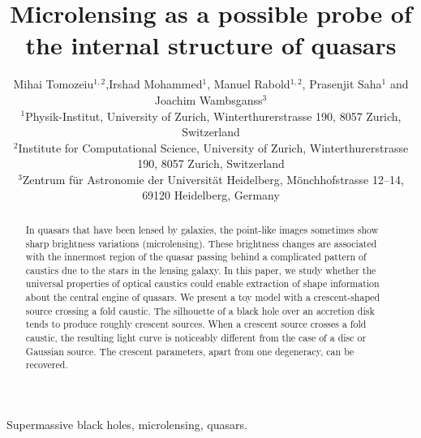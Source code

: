 \documentclass[usenatbib]{mn2e}
\title{Microlensing as a possible probe of the internal structure of quasars}
\author[Tomozeiu et al]{Mihai Tomozeiu$^{1,2}$,Irshad Mohammed$^1$, Manuel Rabold$^{1,2}$,
\newauthor
Prasenjit Saha$^1$ and Joachim Wambsganss$^3$\\
$^1${Physik-Institut, University of Zurich, Winterthurerstrasse 190,
  8057 Zurich, Switzerland} \\
$^2${Institute for Computational Science, University of Zurich,
  Winterthurerstrasse 190, 8057 Zurich, Switzerland} \\
$^3${Zentrum f\"ur Astronomie der Universit\"at Heidelberg,
  M\"onchhofstrasse 12--14, 69120 Heidelberg, Germany}
}
\begin{document}
\maketitle

\begin{abstract}

In quasars that have been lensed by galaxies, the point-like images
sometimes show sharp brightness variations (microlensing).  These
brightness changes are associated with the innermost region of the
quasar passing behind a complicated pattern of caustics due to the
stars in the lensing galaxy.  In this paper, we study whether the
universal properties of optical caustics could enable extraction of
shape information about the central engine of quasars.  We present a
toy model with a crescent-shaped source crossing a fold caustic.  The
silhouette of a black hole over an accretion disk tends to produce
roughly crescent sources.  When a crescent source crosses a fold
caustic, the resulting light curve is noticeably different from the
case of a disc or Gaussian source.  The crescent parameters, apart
from one degeneracy, can be recovered.
\end{abstract}


\begin{keywords}
Supermassive black holes, microlensing, quasars.
\end{keywords}


















\def\apj{ApJ}
\def\apjl{ApJL}
\def\aj{AJ}
\def\mnras{MNRAS}
\def\aap{A\&A}
\def\nat{nature}
\def\araa{ARAA}
\def\pasa{PASA}

\end{document}
